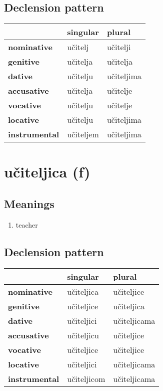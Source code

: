 \subsection*{Declension pattern}
\begin{tabularx}{\linewidth}{Xll}
\toprule
{} &   singular &      plural \\
\midrule
\textbf{nominative  } &    učitelj &    učitelji \\
\textbf{genitive    } &   učitelja &    učitelja \\
\textbf{dative      } &   učitelju &  učiteljima \\
\textbf{accusative  } &   učitelja &    učitelje \\
\textbf{vocative    } &   učitelju &    učitelje \\
\textbf{locative    } &   učitelju &  učiteljima \\
\textbf{instrumental} &  učiteljem &  učiteljima \\
\bottomrule
\end{tabularx}

\filbreak
\section{učiteljica (f)}
\subsection*{Meanings}
\begin{enumerate}
\item teacher
\end{enumerate}
\subsection*{Declension pattern}
\begin{tabularx}{\linewidth}{Xll}
\toprule
{} &     singular &        plural \\
\midrule
\textbf{nominative  } &   učiteljica &    učiteljice \\
\textbf{genitive    } &   učiteljice &    učiteljica \\
\textbf{dative      } &   učiteljici &  učiteljicama \\
\textbf{accusative  } &   učiteljicu &    učiteljice \\
\textbf{vocative    } &   učiteljice &    učiteljice \\
\textbf{locative    } &   učiteljici &  učiteljicama \\
\textbf{instrumental} &  učiteljicom &  učiteljicama \\
\bottomrule
\end{tabularx}

